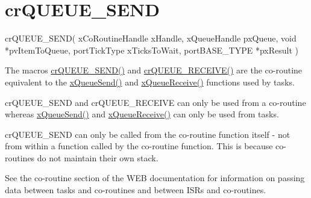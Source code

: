 \hypertarget{group__cr_q_u_e_u_e___s_e_n_d}{}\section{cr\+Q\+U\+E\+U\+E\+\_\+\+S\+E\+ND}
\label{group__cr_q_u_e_u_e___s_e_n_d}

\begin{DoxyPre}
crQUEUE\_SEND(
                 xCoRoutineHandle xHandle,
                 xQueueHandle pxQueue,
                 void *pvItemToQueue,
                 portTickType xTicksToWait,
                 portBASE\_TYPE *pxResult
            )\end{DoxyPre}


The macro\textquotesingle{}s \mbox{\hyperlink{croutine_8h_a26af3d36f22a04168eebdf5b08465d6e}{cr\+Q\+U\+E\+U\+E\+\_\+\+S\+E\+N\+D()}} and \mbox{\hyperlink{croutine_8h_a586d57fd9a3e2aa5ae66484ed3be36c9}{cr\+Q\+U\+E\+U\+E\+\_\+\+R\+E\+C\+E\+I\+V\+E()}} are the co-\/routine equivalent to the \mbox{\hyperlink{queue_8h_af7eb49d3249351176992950d9185abe9}{x\+Queue\+Send()}} and \mbox{\hyperlink{queue_8h_af1549eac0e7f05694a59a0b967c80be3}{x\+Queue\+Receive()}} functions used by tasks.

cr\+Q\+U\+E\+U\+E\+\_\+\+S\+E\+ND and cr\+Q\+U\+E\+U\+E\+\_\+\+R\+E\+C\+E\+I\+VE can only be used from a co-\/routine whereas \mbox{\hyperlink{queue_8h_af7eb49d3249351176992950d9185abe9}{x\+Queue\+Send()}} and \mbox{\hyperlink{queue_8h_af1549eac0e7f05694a59a0b967c80be3}{x\+Queue\+Receive()}} can only be used from tasks.

cr\+Q\+U\+E\+U\+E\+\_\+\+S\+E\+ND can only be called from the co-\/routine function itself -\/ not from within a function called by the co-\/routine function. This is because co-\/routines do not maintain their own stack.

See the co-\/routine section of the W\+EB documentation for information on passing data between tasks and co-\/routines and between I\+SR\textquotesingle{}s and co-\/routines.


